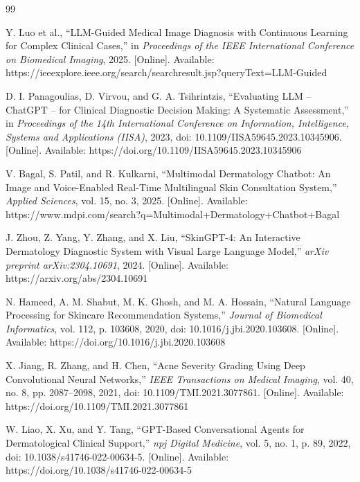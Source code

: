 \begin{thebibliography}{99}

Y. Luo et al., ``LLM-Guided Medical Image Diagnosis with Continuous Learning for Complex Clinical Cases,'' in \textit{Proceedings of the IEEE International Conference on Biomedical Imaging}, 2025. [Online]. Available: https://ieeexplore.ieee.org/search/searchresult.jsp?queryText=LLM-Guided%

D. I. Panagoulias, D. Virvou, and G. A. Tsihrintzis, ``Evaluating LLM -- ChatGPT -- for Clinical Diagnostic Decision Making: A Systematic Assessment,'' in \textit{Proceedings of the 14th International Conference on Information, Intelligence, Systems and Applications (IISA)}, 2023, doi: 10.1109/IISA59645.2023.10345906. [Online]. Available: https://doi.org/10.1109/IISA59645.2023.10345906

V. Bagal, S. Patil, and R. Kulkarni, ``Multimodal Dermatology Chatbot: An Image and Voice-Enabled Real-Time Multilingual Skin Consultation System,'' \textit{Applied Sciences}, vol. 15, no. 3, 2025. [Online]. Available: https://www.mdpi.com/search?q=Multimodal+Dermatology+Chatbot+Bagal

J. Zhou, Z. Yang, Y. Zhang, and X. Liu, ``SkinGPT-4: An Interactive Dermatology Diagnostic System with Visual Large Language Model,'' \textit{arXiv preprint arXiv:2304.10691}, 2024. [Online]. Available: https://arxiv.org/abs/2304.10691

N. Hameed, A. M. Shabut, M. K. Ghosh, and M. A. Hossain, ``Natural Language Processing for Skincare Recommendation Systems,'' \textit{Journal of Biomedical Informatics}, vol. 112, p. 103608, 2020, doi: 10.1016/j.jbi.2020.103608. [Online]. Available: https://doi.org/10.1016/j.jbi.2020.103608

X. Jiang, R. Zhang, and H. Chen, ``Acne Severity Grading Using Deep Convolutional Neural Networks,'' \textit{IEEE Transactions on Medical Imaging}, vol. 40, no. 8, pp. 2087--2098, 2021, doi: 10.1109/TMI.2021.3077861. [Online]. Available: https://doi.org/10.1109/TMI.2021.3077861

W. Liao, X. Xu, and Y. Tang, ``GPT-Based Conversational Agents for Dermatological Clinical Support,'' \textit{npj Digital Medicine}, vol. 5, no. 1, p. 89, 2022, doi: 10.1038/s41746-022-00634-5. [Online]. Available: https://doi.org/10.1038/s41746-022-00634-5


\end{thebibliography}

